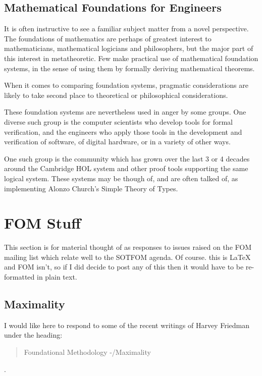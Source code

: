 \documentclass[10pt,titlepage]{article}
\begin{document}
\pagebreak
\subsection{Mathematical Foundations for Engineers}

It is often instructive to see a familiar subject matter from a novel perspective.
The foundations of mathematics are perhaps of greatest interest to mathematicians, mathematical logicians and philosophers, but the major part of this interest in metatheoretic.
Few make practical use of mathematical foundation systems, in the sense of using them by formally deriving mathematical theorems.

When it comes to comparing foundation systems, pragmatic considerations are likely to take second place to theoretical or philosophical considerations.

These foundation systems are nevertheless used in anger by some groups.
One diverse such group is the computer scientists who develop tools for formal verification, and the engineers who apply those tools in the development and verification of software, of digital hardware, or in a variety of other ways.

One such group is the community which has grown over the last 3 or 4 decades around the Cambridge HOL system and other proof tools supporting the same logical system.
These systems may be though of, and are often talked of, as implementing Alonzo Church's Simple Theory of Types.

\section{FOM Stuff}

This section is for material thought of as responses to issues raised on the FOM mailing list which relate well to the SOTFOM agenda.
Of course. this is LaTeX and FOM isn't, so if I did decide to post any of this then it would have to be re-formatted in plain text.

\subsection{Maximality}

I would like here to respond to some of the recent writings of Harvey Friedman under the heading:

\begin{quote}
Foundational Methodology -/Maximality
\end{quote}
.
\end{document}
